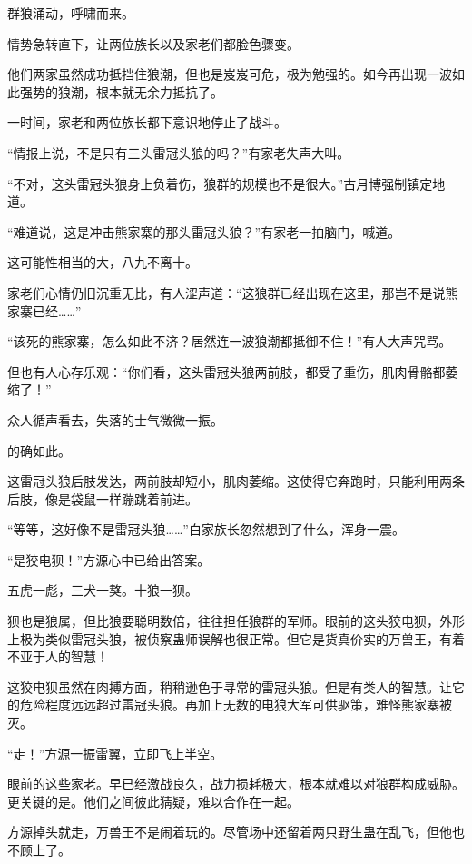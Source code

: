 
\begin{this_body}



群狼涌动，呼啸而来。

情势急转直下，让两位族长以及家老们都脸色骤变。

他们两家虽然成功抵挡住狼潮，但也是岌岌可危，极为勉强的。如今再出现一波如此强势的狼潮，根本就无余力抵抗了。

一时间，家老和两位族长都下意识地停止了战斗。

“情报上说，不是只有三头雷冠头狼的吗？”有家老失声大叫。

“不对，这头雷冠头狼身上负着伤，狼群的规模也不是很大。”古月博强制镇定地道。

“难道说，这是冲击熊家寨的那头雷冠头狼？”有家老一拍脑门，喊道。

这可能性相当的大，八九不离十。

家老们心情仍旧沉重无比，有人涩声道：“这狼群已经出现在这里，那岂不是说熊家寨已经……”

“该死的熊家寨，怎么如此不济？居然连一波狼潮都抵御不住！”有人大声咒骂。

但也有人心存乐观：“你们看，这头雷冠头狼两前肢，都受了重伤，肌肉骨骼都萎缩了！”

众人循声看去，失落的士气微微一振。

的确如此。

这雷冠头狼后肢发达，两前肢却短小，肌肉萎缩。这使得它奔跑时，只能利用两条后肢，像是袋鼠一样蹦跳着前进。

“等等，这好像不是雷冠头狼……”白家族长忽然想到了什么，浑身一震。

“是狡电狈！”方源心中已给出答案。

五虎一彪，三犬一獒。十狼一狈。

狈也是狼属，但比狼要聪明数倍，往往担任狼群的军师。眼前的这头狡电狈，外形上极为类似雷冠头狼，被侦察蛊师误解也很正常。但它是货真价实的万兽王，有着不亚于人的智慧！

这狡电狈虽然在肉搏方面，稍稍逊色于寻常的雷冠头狼。但是有类人的智慧。让它的危险程度远远超过雷冠头狼。再加上无数的电狼大军可供驱策，难怪熊家寨被灭。

“走！”方源一振雷翼，立即飞上半空。

眼前的这些家老。早已经激战良久，战力损耗极大，根本就难以对狼群构成威胁。更关键的是。他们之间彼此猜疑，难以合作在一起。

方源掉头就走，万兽王不是闹着玩的。尽管场中还留着两只野生蛊在乱飞，但他也不顾上了。


\end{this_body}
